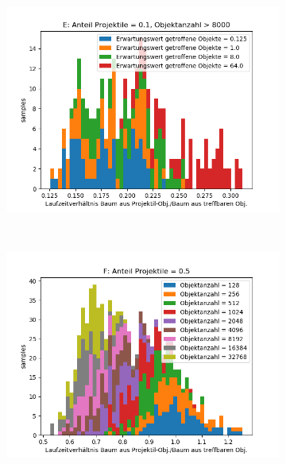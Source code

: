 \begin{figure}
\begin{subfigure}[t]{0.55\textwidth}
		\label{fig:boxsortChoice-shotgun-D}
	\end{subfigure}
~
	\begin{subfigure}[t]{0.55\textwidth}
		\centering
		\includegraphics[width=1\textwidth]{./res/boxsortChoice-shotgun-E.png}

		\label{fig:boxsortChoice-shotgun-E}
	\end{subfigure}
~
	\begin{subfigure}[t]{0.55\textwidth}
		\centering
		\includegraphics[width=1\textwidth]{./res/boxsortChoice-shotgun-F.png}


\end{subfigure}
\end{figure}
